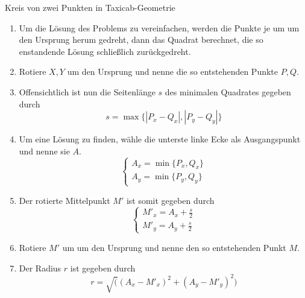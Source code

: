 \documentclass{article}
\begin{document}
\begin{algorithm}[H]
    \caption{Kreis von zwei Punkten in Taxicab-Geometrie}
    \BlankLine
    \begin{enumerate}
    \item Um die Lösung des Problems zu vereinfachen, werden die Punkte je um \unit[45]{\textdegree} um den
    Ursprung herum gedreht, dann das Quadrat berechnet, die so enstandende Lösung schließlich zurückgedreht.
    \item Rotiere $X, Y$ \unit[45]{\textdegree} um den Ursprung und nenne die so entstehenden Punkte $P, Q$.
    \item Offensichtlich ist nun die Seitenlänge $s$ des minimalen Quadrates gegeben durch
    \begin{equation}
    s = \max\{|P_x - Q_x|, |P_y - Q_y|\}
    \end{equation}
    \item Um eine Lösung zu finden, wähle die unterste linke Ecke als Ausgangspunkt und nenne sie $A$.
    \begin{equation}
    \begin{cases}
    A_x = \min\{P_x,Q_x\}\\
    A_y = \min\{P_y,Q_y\}
    \end{cases}
    \end{equation}
    \item Der rotierte Mittelpunkt $M'$ ist somit gegeben durch
    \begin{equation}
    \begin{cases}
    M'_x = A_x + \frac{s}{2}\\
    M'_y = A_y + \frac{s}{2}
    \end{cases}
    \end{equation}
    \item Rotiere $M'$ um \unit[45]{\textdegree} um den Ursprung und nenne den so entstehenden Punkt $M$.
    \item Der Radius $r$ ist gegeben durch 
    \begin{equation}
    r = \sqrt( (A_x - M'_x) ^ 2 + (A_y - M'_y) ^ 2 )     
    \end{equation}
    \end{enumerate}
\end{algorithm} 
\end{document}
